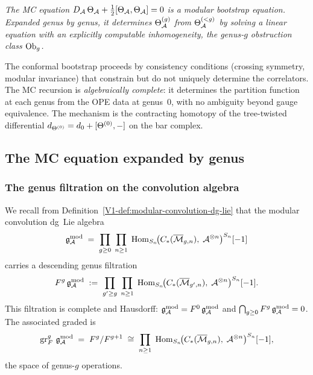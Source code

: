 \begin{center}
\emph{The MC equation $D_{\mathcal{A}}\,\Theta_{\mathcal{A}}
+ \tfrac{1}{2}[\Theta_{\mathcal{A}},\Theta_{\mathcal{A}}] = 0$
is a modular bootstrap equation. Expanded genus by genus,
it determines $\Theta^{(g)}_{\mathcal{A}}$ from $\Theta^{(<g)}_{\mathcal{A}}$
by solving a linear equation with an explicitly computable
inhomogeneity, the genus-$g$ obstruction class $\mathrm{Ob}_g$.}
\end{center}

The conformal bootstrap proceeds by consistency conditions
(crossing symmetry, modular invariance) that constrain but
do not uniquely determine the correlators. The MC recursion
is \emph{algebraically complete}: it determines the partition
function at each genus from the OPE data at genus~$0$, with
no ambiguity beyond gauge equivalence. The mechanism is the
contracting homotopy of the tree-twisted differential
$d_{\Theta^{(0)}} = d_0 + [\Theta^{(0)}, -]$ on the
bar complex.

%
%

\subsection{The MC equation expanded by genus}

\subsubsection{The genus filtration on the convolution algebra}

We recall from Definition~\ref*{V1-def:modular-convolution-dg-lie}
that the modular convolution dg~Lie algebra
\begin{equation}%
\gAmod
\;=\;
\prod_{g \geq 0}\;
\prod_{n \geq 1}\;
\Hom_{S_n}\!\bigl(
C_*(\overline{\cM}_{g,n}),\;
\cA^{\otimes n}
\bigr)^{S_n}[-1]
\end{equation}
carries a descending genus filtration
\begin{equation}%
F^g\,\gAmod
\;:=\;
\prod_{g' \geq g}\;
\prod_{n \geq 1}\;
\Hom_{S_n}\!\bigl(
C_*(\overline{\cM}_{g',n}),\;
\cA^{\otimes n}
\bigr)^{S_n}[-1].
\end{equation}
This filtration is complete and Hausdorff:
$\mathfrak{g}_{\mathcal{A}}^{\mathrm{mod}} = F^0\,\mathfrak{g}_{\mathcal{A}}^{\mathrm{mod}}$ and
$\bigcap_{g \geq 0} F^g\,\mathfrak{g}_{\mathcal{A}}^{\mathrm{mod}} = 0$.
The associated graded is
\begin{equation}%
\gr^g_F\,\gAmod
\;=\;
F^g / F^{g+1}
\;\cong\;
\prod_{n \geq 1}\;
\Hom_{S_n}\!\bigl(
C_*(\overline{\cM}_{g,n}),\;
\cA^{\otimes n}
\bigr)^{S_n}[-1],
\end{equation}
the space of genus-$g$ operations.

